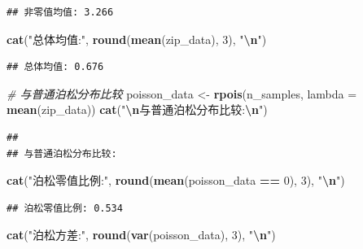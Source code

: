 \documentclass[
  twoside]{book}
\newenvironment{Shaded}{\begin{snugshade}}{\end{snugshade}}
\newcommand{\AttributeTok}[1]{\textcolor[rgb]{0.13,0.29,0.53}{#1}}
\newcommand{\CommentTok}[1]{\textcolor[rgb]{0.56,0.35,0.01}{\textit{#1}}}
\newcommand{\DecValTok}[1]{\textcolor[rgb]{0.00,0.00,0.81}{#1}}
\newcommand{\FunctionTok}[1]{\textcolor[rgb]{0.13,0.29,0.53}{\textbf{#1}}}
\newcommand{\NormalTok}[1]{#1}
\newcommand{\OtherTok}[1]{\textcolor[rgb]{0.56,0.35,0.01}{#1}}
\newcommand{\SpecialCharTok}[1]{\textcolor[rgb]{0.81,0.36,0.00}{\textbf{#1}}}
\newcommand{\StringTok}[1]{\textcolor[rgb]{0.31,0.60,0.02}{#1}}
\begin{document}
\begin{verbatim}
## 非零值均值: 3.266
\end{verbatim}

\begin{Shaded}
\begin{Highlighting}[]
\FunctionTok{cat}\NormalTok{(}\StringTok{"总体均值:"}\NormalTok{, }\FunctionTok{round}\NormalTok{(}\FunctionTok{mean}\NormalTok{(zip\_data), }\DecValTok{3}\NormalTok{), }\StringTok{"}\SpecialCharTok{\textbackslash{}n}\StringTok{"}\NormalTok{)}
\end{Highlighting}
\end{Shaded}

\begin{verbatim}
## 总体均值: 0.676
\end{verbatim}

\begin{Shaded}
\begin{Highlighting}[]
\CommentTok{\# 与普通泊松分布比较}
\NormalTok{poisson\_data }\OtherTok{\textless{}{-}} \FunctionTok{rpois}\NormalTok{(n\_samples, }\AttributeTok{lambda =} \FunctionTok{mean}\NormalTok{(zip\_data))}
\FunctionTok{cat}\NormalTok{(}\StringTok{"}\SpecialCharTok{\textbackslash{}n}\StringTok{与普通泊松分布比较:}\SpecialCharTok{\textbackslash{}n}\StringTok{"}\NormalTok{)}
\end{Highlighting}
\end{Shaded}

\begin{verbatim}
## 
## 与普通泊松分布比较:
\end{verbatim}

\begin{Shaded}
\begin{Highlighting}[]
\FunctionTok{cat}\NormalTok{(}\StringTok{"泊松零值比例:"}\NormalTok{, }\FunctionTok{round}\NormalTok{(}\FunctionTok{mean}\NormalTok{(poisson\_data }\SpecialCharTok{==} \DecValTok{0}\NormalTok{), }\DecValTok{3}\NormalTok{), }\StringTok{"}\SpecialCharTok{\textbackslash{}n}\StringTok{"}\NormalTok{)}
\end{Highlighting}
\end{Shaded}

\begin{verbatim}
## 泊松零值比例: 0.534
\end{verbatim}

\begin{Shaded}
\begin{Highlighting}[]
\FunctionTok{cat}\NormalTok{(}\StringTok{"泊松方差:"}\NormalTok{, }\FunctionTok{round}\NormalTok{(}\FunctionTok{var}\NormalTok{(poisson\_data), }\DecValTok{3}\NormalTok{), }\StringTok{"}\SpecialCharTok{\textbackslash{}n}\StringTok{"}\NormalTok{)}
\end{Highlighting}
\end{Shaded}
\end{document}
